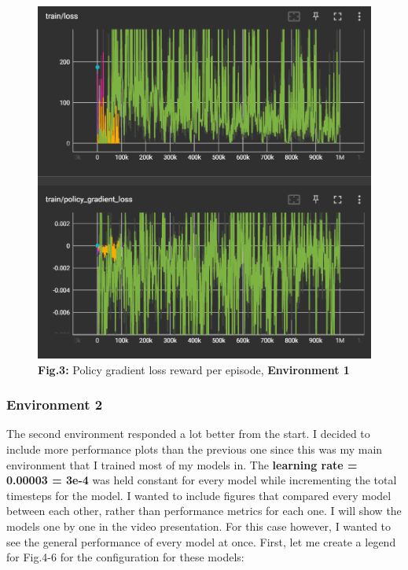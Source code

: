 \documentclass{article}
\numberwithin{equation}{section}
\numberwithin{equation}{section}
\begin{document}
\begin{figure}[H]
	\centering
\includegraphics[width=\linewidth]{loss_env1.png}
	\\	
	\vspace{0.1in}
	\textbf{Fig.3:} Policy gradient loss reward per episode, \textbf{Environment 1}
	\\
	\label{fig:Fig.3}
\end{figure}




\subsubsection*{Environment 2}
The second environment responded a lot better from the start. I decided to include more performance plots than the previous one since this was my main environment that I trained most of my models in. The \textbf{learning rate = 0.00003 = 3e-4} was held constant for every model while incrementing the total timesteps for the model. I wanted to include figures that compared every model between each other, rather than performance metrics for each one. I will show the models one by one in the video presentation. For this case however, I wanted to see the general performance of every model at once. First, let me create a legend for Fig.4-6 for the configuration for these models:
\end{document}
